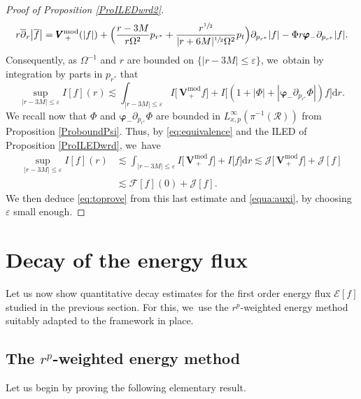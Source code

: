 \documentclass[JEP,XML,SOM,Unicode,published]{cedram}
\let\epsilon\varepsilon
\theoremstyle{plain}
\theoremstyle{definition}
\newcommand\dr{{\mathrm{d}}}
\begin{document}
\begin{proof}[Proof of Proposition \ref{ProILEDwrd2}]
\[
r \overline{\partial}_r\big|\overline{f}\big|= \pmb{V}_{\, +}^{ \mathrm{mod}}(|f|)+\Bigl(\frac{r-3M}{r\Omega^2}p_{r^*}+\frac{r^{\sfrac{1}{2}}}{|r+6M|^{\sfrac{1}{2}} \Omega^2}p_t \Bigr) \partial_{p_{r^*}}|f|-\Phi r \pmb{\varphi}_- \partial_{p_{r^*}}|f|.
\]
Consequently, as $\Omega^{-1}$ and $r$ are bounded on $\{|r-3M| \leq \epsilon \}$, we~obtain by integration by parts in $p_{r^*}$ that
\[
\sup_{|r-3M| \leq \epsilon } I[f](r) \lesssim \int_{|r-3M| \leq \epsilon} I\bigl[ \, \pmb{V}_{\, +}^{ \mathrm{mod}}f \bigr]+ I \bigl[(1+|\Phi|+|\pmb{\varphi}_-\partial_{p_{r^*}} \Phi|)f \bigr] \dr r.
\]
We recall now that $\Phi$ and $\pmb{\varphi}_-\partial_{p_{r^*}} \Phi$ are bounded in $L_{x,p}^\infty(\pi^{-1}(\mathcal{R}))$ from Proposition \ref{ProboundPsi}. Thus, by \eqref{eq:equivalence} and the ILED of Proposition \ref{ProILEDwrd}, we~have
\begin{align*}
\sup_{|r-3M| \leq \epsilon } I[f](r) & \lesssim \int_{|r-3M| \leq \epsilon} I \bigl[ \, \pmb{V}_{\, +}^{ \mathrm{mod}}f \bigr] + I \bigl[f \bigr] \dr r \lesssim \mathcal{J} \bigl[ \, \pmb{V}_{\, +}^{ \mathrm{mod}}f \bigr]+\mathcal{J}[f] \\
& \lesssim \mathcal{F}[f](0)+ \mathcal{J}[f].
\end{align*}
We then deduce \eqref{eq:toprove} from this last estimate and \eqref{equa:auxi}, by choosing $\epsilon$ small enough.
\end{proof}

\section{Decay of the energy flux}\label{Sec7}

Let us now show quantitative decay estimates for the first order energy flux $\mathcal{E}[f]$ studied in the previous section. For this, we~use the $r^p$-weighted energy method suitably adapted to the framework in place.

\subsection{The $r^p$-weighted energy method}

Let us begin by proving the following elementary result.
\end{document}
